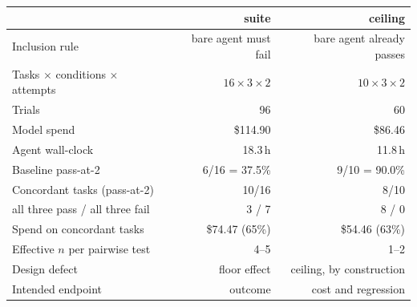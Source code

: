 
\begin{tabular}{@{}lrr@{}}
\toprule
 & \textbf{suite} & \textbf{ceiling} \\
\midrule
Inclusion rule & bare agent must fail & bare agent already passes \\
Tasks $\times$ conditions $\times$ attempts & $16\times3\times2$ & $10\times3\times2$ \\
Trials & 96 & 60 \\
Model spend & \$114.90 & \$86.46 \\
Agent wall-clock & 18.3\,h & 11.8\,h \\
Baseline pass-at-2 & 6/16 = 37.5\% & 9/10 = 90.0\% \\
Concordant tasks (pass-at-2) & 10/16 & 8/10 \\
\quad all three pass / all three fail & 3 / 7 & 8 / 0 \\
Spend on concordant tasks & \$74.47 (65\%) & \$54.46 (63\%) \\
Effective $n$ per pairwise test & 4--5 & 1--2 \\
Design defect & floor effect & ceiling, by construction \\
Intended endpoint & outcome & cost and regression \\
\bottomrule
\end{tabular}
